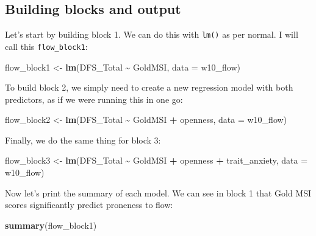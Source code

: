 \documentclass[
]{book}
\newenvironment{Shaded}{\begin{snugshade}}{\end{snugshade}}
\newcommand{\AttributeTok}[1]{\textcolor[rgb]{0.13,0.29,0.53}{#1}}
\newcommand{\FunctionTok}[1]{\textcolor[rgb]{0.13,0.29,0.53}{\textbf{#1}}}
\newcommand{\NormalTok}[1]{#1}
\newcommand{\OtherTok}[1]{\textcolor[rgb]{0.56,0.35,0.01}{#1}}
\newcommand{\SpecialCharTok}[1]{\textcolor[rgb]{0.81,0.36,0.00}{\textbf{#1}}}
\begin{document}
\hypertarget{building-blocks-and-output}{%
\subsection{Building blocks and output}\label{building-blocks-and-output}}

Let's start by building block 1. We can do this with \texttt{lm()} as per normal. I will call this \texttt{flow\_block1}:

\begin{Shaded}
\begin{Highlighting}[]
\NormalTok{flow\_block1 }\OtherTok{\textless{}{-}} \FunctionTok{lm}\NormalTok{(DFS\_Total }\SpecialCharTok{\textasciitilde{}}\NormalTok{ GoldMSI, }\AttributeTok{data =}\NormalTok{ w10\_flow)}
\end{Highlighting}
\end{Shaded}

To build block 2, we simply need to create a new regression model with both predictors, as if we were running this in one go:

\begin{Shaded}
\begin{Highlighting}[]
\NormalTok{flow\_block2 }\OtherTok{\textless{}{-}} \FunctionTok{lm}\NormalTok{(DFS\_Total }\SpecialCharTok{\textasciitilde{}}\NormalTok{ GoldMSI }\SpecialCharTok{+}\NormalTok{ openness, }\AttributeTok{data =}\NormalTok{ w10\_flow)}
\end{Highlighting}
\end{Shaded}

Finally, we do the same thing for block 3:

\begin{Shaded}
\begin{Highlighting}[]
\NormalTok{flow\_block3 }\OtherTok{\textless{}{-}} \FunctionTok{lm}\NormalTok{(DFS\_Total }\SpecialCharTok{\textasciitilde{}}\NormalTok{ GoldMSI }\SpecialCharTok{+}\NormalTok{ openness }\SpecialCharTok{+}\NormalTok{ trait\_anxiety, }\AttributeTok{data =}\NormalTok{ w10\_flow)}
\end{Highlighting}
\end{Shaded}

Now let's print the summary of each model. We can see in block 1 that Gold MSI scores significantly predict proneness to flow:

\begin{Shaded}
\begin{Highlighting}[]
\FunctionTok{summary}\NormalTok{(flow\_block1)}
\end{Highlighting}
\end{Shaded}
\end{document}
